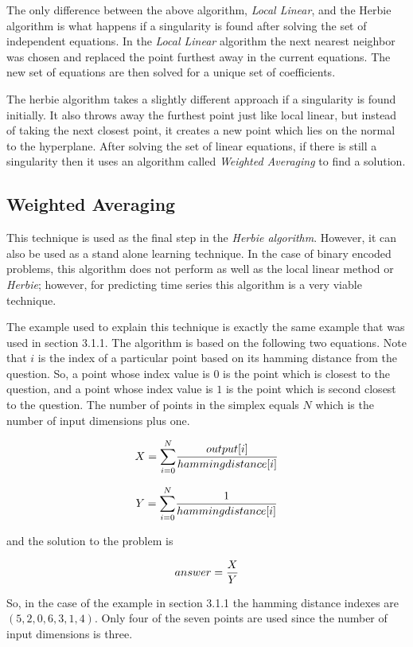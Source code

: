 	The only difference between the above algorithm, {\it Local
Linear}, and the Herbie algorithm is what happens if a singularity is
found after solving the set of independent equations.  In the {\it
Local Linear} algorithm the next nearest neighbor was chosen and replaced
the point furthest away in the current equations.  The new set of
equations are then solved for a unique set of coefficients.

	The herbie algorithm takes a slightly different approach if a
singularity is found initially.  It also throws away the furthest
point just like local linear, but instead of taking the next closest
point, it creates a new point which lies on the normal to the
hyperplane.  After solving the set of linear equations, if there is
still a singularity then it uses an algorithm called {\it Weighted
Averaging} to find a solution.	

\subsection{Weighted Averaging}

	This technique is used as the final step in the {\it Herbie
algorithm}.  However, it can also be used as a stand alone learning
technique.  In the case of binary encoded problems, this algorithm
does not perform as well as the local linear method or {\it Herbie};
however, for predicting time series this algorithm is a very viable
technique.

	The example used to explain this technique is exactly the same
example that was used in section 3.1.1.  The algorithm is based on the
following two equations.  Note that $i$ is the index of a particular
point based on its hamming distance from the question.  So, a point
whose index value is $0$ is the point which is closest to the
question, and a point whose index value is $1$ is the point which is
second closest to the question.  The number of points in the simplex
equals $N$ which is the number of input dimensions plus one.

\vfill
\eject
	$$X = {\sum_{i = 0}^N} {output[i] \over
hammingdistance[i]}$$

	$$Y = {\sum_{i = 0}^N} {1 \over hammingdistance[i]}$$

	and the solution to the problem is

	$$answer = {X \over Y}$$

	So, in the case of the example in section 3.1.1 the hamming
distance indexes are $(5, 2, 0, 6, 3, 1, 4)$.  Only four of the seven
points are used since the number of input dimensions is three.

